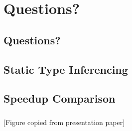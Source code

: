 \documentclass[mathserif,10pt]{beamer}
\begin{document}
\section{Questions?}
\subsection{Questions?}
\frame
{}

\subsection{Static Type Inferencing}
\frame
{
  \frametitle{\subsecname}
  \begin{figure}[h]
  \centering
  \end{figure}
}

\subsection{Speedup Comparison}
\frame
{
  \frametitle{\subsecname}
  \begin{figure}[h]
  \centering
  \end{figure}
  [Figure copied from presentation paper]
}
\end{document}
